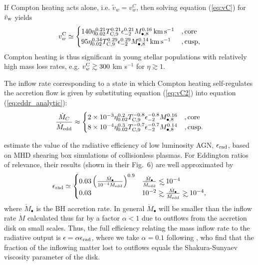 \documentclass[usenatbib,fleqn]{mn2e}
\newcommand\lsim{\mathrel{\rlap{\lower4pt\hbox{\hskip1pt$\sim$}}
    \raise1pt\hbox{$<$}}}
\newcommand\gsim{\mathrel{\rlap{\lower4pt\hbox{\hskip1pt$\sim$}}
    \raise1pt\hbox{$>$}}}
\begin{document}
If Compton heating acts alone, i.e. $\tilde{v}_{w} = v_{w}^{C}$, then
solving equation (\ref{eq:vC}) for $\tilde{v}_{\rm w}$ yields
\begin{align} v_{w}^{\rm C} \simeq
  \begin{cases} 140 \eta_{0.02}^{0.21}T_{\rm
C,9}^{0.21}\epsilon_{-2}^{0.21} M_{\bullet,8}^{0.16}\,{\rm km\,s^{-1}}
&, \text{core}\\ 95 \eta_{0.02}^{0.34}T_{\rm
C,9}^{0.29}\epsilon_{-2}^{0.29} M_{\bullet,8}^{0.14}\,{\rm km\,s^{-1}}
&, \text{cusp},
  \end{cases}
  \label{eq:vC2}
\end{align} 
Compton heating is thus significant in young stellar populations
with relatively high mass loss rates, e.g. $v_{w}^{\rm C} \gtrsim 300$
km s$^{-1}$ for $\eta \gtrsim 1$.  

The inflow rate corresponding to a state in which Compton heating
self-regulates the accretion flow is given by substituting equation
(\ref{eq:vC2}) into equation (\ref{eq:eddr_analytic}):
\begin{align}
\frac{\dot{M}_{C}}{\dot{M}_{\rm edd}} \approx 
\begin{cases} 2\times 10^{-3} \eta_{0.02}^{0.2}T_{\rm
C,9}^{-0.8}\epsilon_{-2}^{-0.8} M_{\bullet,8}^{0.16}
&, \text{core}\\ 8\times 10^{-4} \eta_{0.02}^{0.3}T_{\rm
C,9}^{-0.7}\epsilon_{-2}^{-0.7} M_{\bullet,8}^{0.14}
&, \text{cusp}.
  \end{cases}
  \label{eq:MdotCa}
\end{align}

\citet{Sharma+2007} estimate the value of the radiative efficiency of
low luminosity AGN, $\epsilon_{\rm rad}$, based on MHD shearing box
simulations of collisionless plasmas.  For Eddington ratios of
relevance, their results (shown in their Fig.~6) are well approximated
by
\begin{align}
\epsilon_{\rm rad} \simeq 
\begin{cases}
  0.03 \left(\frac{\dot{M}_{\bullet}}{10^{-4}\dot{M}_{\rm edd}}\right)^{0.9} & \frac{\dot{M}_{\bullet}}{\dot{M}_{\rm edd}} \lsim 10^{-4} \\
 0.03 &  10^{-2} \gsim \frac{\dot{M}_{\bullet}}{\dot{M}_{\rm edd}} \gsim  10^{-4},
\end{cases}
\label{eq:efficiency}
\end{align}
where $\dot{M}_{\bullet}$ is the BH accretion rate. In general
$\dot{M}_{\bullet}$ will be smaller than the inflow rate $\dot{M}$
calculated thus far by a factor $\alpha < 1$ due to outflows from the
accretion disk on small scales.  Thus, the full efficiency relating
the mass inflow rate to the radiative output is $\epsilon = \alpha
\epsilon_{\rm rad}$, where we take $\alpha = 0.1$ following
\citet{Li+2013}, who find that the fraction of the inflowing matter
lost to outflows equals the Shakura-Sunyaev viscosity parameter of the
disk.
\end{document}
